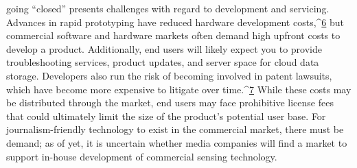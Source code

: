 going ``closed'' presents challenges with regard to development and servicing.
Advances in rapid prototyping have reduced hardware development
costs,^{\href{#endnotes-schroyer}{6}} but commercial software and hardware markets often demand high
upfront costs to develop a product. Additionally, end users will likely expect
you to provide troubleshooting services, product updates, and server space
for cloud data storage. Developers also run the risk of becoming involved
in patent lawsuits, which have become more expensive to litigate over
time.^{\href{#endnotes-schroyer}{7}} While these costs may be distributed through the market, end users
may face prohibitive license fees that could ultimately limit the size of the
product's potential user base. For journalism-friendly technology to exist
in the commercial market, there must be demand; as of yet, it is uncertain
whether media companies will find a market to support in-house development
of commercial sensing technology.

